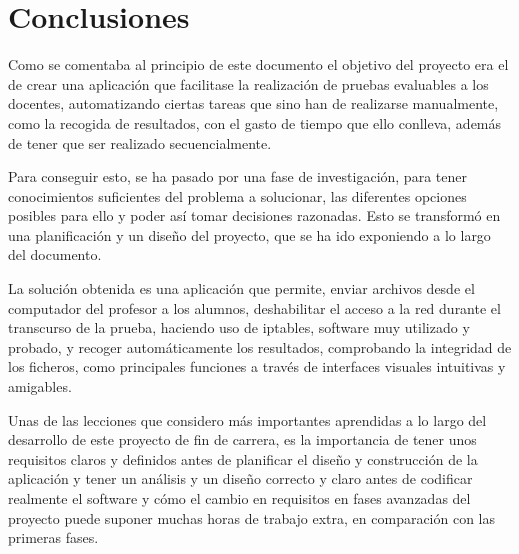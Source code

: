 

\label{chap:futuro}

\section{Conclusiones}
\label{sec:futuro:conclusiones}

Como se comentaba al principio de este documento el objetivo del proyecto era el de crear una aplicación que facilitase la realización de pruebas evaluables a los docentes, automatizando ciertas tareas que sino han de realizarse manualmente, como la recogida de resultados, con el gasto de tiempo que ello conlleva, además de tener que ser realizado secuencialmente.
\newline

Para conseguir esto, se ha pasado por una fase de investigación, para tener conocimientos suficientes del problema a solucionar, las diferentes opciones posibles para ello y poder así tomar decisiones razonadas. Esto se transformó en una planificación y un diseño del proyecto, que se ha ido exponiendo a lo largo del documento.
\newline

La solución obtenida es una aplicación que permite, enviar archivos desde el computador del profesor a los alumnos, deshabilitar el acceso a la red durante el transcurso de la prueba, haciendo uso de iptables, software muy utilizado y probado, y recoger automáticamente los resultados, comprobando la integridad de los ficheros, como principales funciones a través de interfaces visuales intuitivas y amigables.
\newline


Unas de las lecciones que considero más importantes aprendidas a lo largo del desarrollo de este proyecto de fin de carrera, es la importancia de tener unos requisitos claros y definidos antes de planificar el diseño y construcción de la aplicación y tener un análisis y un diseño correcto y claro antes de codificar realmente el software y cómo el cambio en requisitos en fases avanzadas del proyecto puede suponer muchas horas de trabajo extra, en comparación con las primeras fases.
\newline

